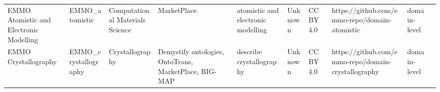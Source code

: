 \begin{tabular}{llllllllll}
                                          EMMO Atomistic and Electronic Modelling &          EMMO_atomistic &             Computational Materials Science &                                                                                                                                                                                                                                                                                                                                                          MarketPlace &                                                                                                                                                                                                                                                                                                                                                                     atomistic and electronic modelling &                                                                                                            Unknown &                                    CC BY 4.0 &                                                     https://github.com/emmo-repo/domain-atomistic  &      domain-level \\
                                                             EMMO Crystallography &    EMMO_crystallography &                             Crystallography &                                                                                                                                                                                                                                                                                                                Demystify ontologies, OntoTrans, MarketPlace, BIG-MAP &                                                                                                                                                                                                                                                                                                                                                                               describe crystallography &                                                                                                            Unknown &                                    CC BY 4.0 &                                               https://github.com/emmo-repo/domain-crystallography  &      domain-level \\

\end{tabular}
